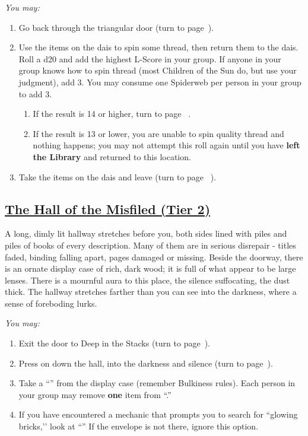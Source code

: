 \documentclass[sheet]{GL2020}
\begin{document}
\begingroup
\itshape
You may:
\begin{enumerate}[A]
  \item Go back through the triangular door (turn to page~\pageref{DeepStacks}).
	\item Use the items on the dais to spin some thread, then return them to the dais. Roll a d20 and add the highest L-Score in your group. If anyone in your group knows how to spin thread (most Children of the Sun do, but use your judgment), add 3. You may consume one Spiderweb per person in your group to add 3. 
	\begin{enumerate}
		\item If the result is 14 or higher, turn to page ~\pageref{SpinningThreadChamberofFates}.
		\item If the result is 13 or lower, you are unable to spin quality thread and nothing happens; you may not attempt this roll again until you have \textbf{left the Library} and returned to this location.
	\end{enumerate}
	\item Take the items on the dais and leave (turn to page ~\pageref{SpinningThreadChamberofFates}).
\end{enumerate}
\endgroup

\clearpage

\begin{center}\section*{\underline{The Hall of the Misfiled (Tier 2)}}\end{center}
\label{HallMisfiled}

A long, dimly lit hallway stretches before you, both sides lined with piles and piles of books of every description. Many of them are in serious disrepair - titles faded, binding falling apart, pages damaged or missing. Beside the doorway, there is an ornate display case of rich, dark wood; it is full of what appear to be large lenses. There is a mournful aura to this place, the silence suffocating, the dust thick. The hallway stretches farther than you can see into the darkness, where a sense of foreboding lurks. 

\vspace{0.5cm}

\begingroup
\itshape
You may:
\begin{enumerate}[A]
  \item Exit the door to Deep in the Stacks (turn to page~\pageref{DeepStacks}).
	\item Press on down the hall, into the darkness and silence (turn to page~\pageref{IntotheDarkness}).
	\item Take a ``\iCrystalLens{}'' from the display case (remember Bulkiness rules). Each person in your group may remove \textbf{one} item from ``\sDustyCaseEnvelope{}.''
	\item If you have encountered a mechanic that prompts you to search for ``glowing bricks,’’ look at ``\sBlueBrickTenEnvelope{}'' If the envelope is not there, ignore this option.
\end{enumerate}
\endgroup
\end{document}
